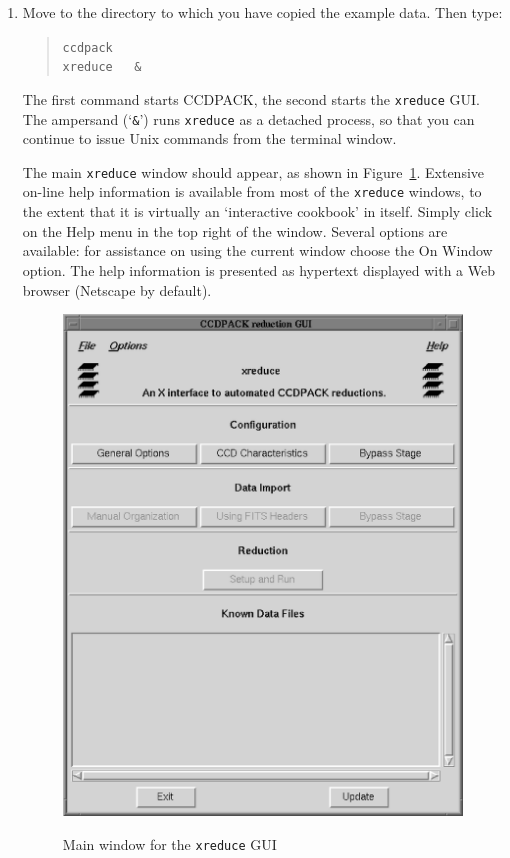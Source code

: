 \documentclass[twoside,11pt]{article}
\begin{document}
\begin{enumerate}

  \item Move to the directory to which you have copied the example data.
   Then type:

  \begin{quote}
   {\tt ccdpack \\
   xreduce ~ \&}
  \end{quote}

   The first command starts CCDPACK, the second starts the {\tt xreduce}
   GUI.  The ampersand (`{\tt \&}') runs {\tt xreduce} as a detached
   process, so that you can continue to issue Unix commands from the
   terminal window.

   The main {\tt xreduce} window should appear, as shown in
   Figure~\ref{XREDUCE}.  Extensive on-line help information is available
   from most of the {\tt xreduce} windows, to the extent that it is
   virtually an `interactive cookbook' in itself.  Simply click on the {\sf
   Help} menu in the top right of the window.  Several options are available:
   for assistance on using the current window choose the {\sf On Window}
   option.  The help information is presented as hypertext displayed with
   a Web browser (Netscape by default).

  \begin{figure}[htbp]
     \centering 
      \includegraphics[totalheight=5in]{sc5_xreduce.ps}
      \begin{quote}
      \caption{Main window for the {\tt xreduce} GUI
      \label{XREDUCE} }
      \end{quote}
  \end{figure}


\end{enumerate}
\end{document}
